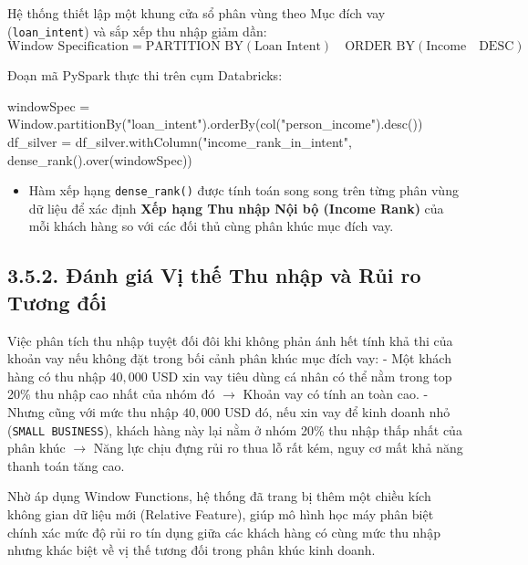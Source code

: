 \documentclass[
  13pt,
  a4paper,
]{report}
\newenvironment{Shaded}{\begin{snugshade}}{\end{snugshade}}
\newcommand{\NormalTok}[1]{\textcolor[rgb]{0.00,0.23,0.31}{#1}}
\newcommand{\OperatorTok}[1]{\textcolor[rgb]{0.37,0.37,0.37}{#1}}
\newcommand{\StringTok}[1]{\textcolor[rgb]{0.13,0.47,0.30}{#1}}
\providecommand{\tightlist}{%
  \setlength{\itemsep}{0pt}\setlength{\parskip}{0pt}}
\begin{document}
Hệ thống thiết lập một khung cửa sổ phân vùng theo Mục đích vay
(\texttt{loan\_intent}) và sắp xếp thu nhập giảm dần:
\[\text{Window Specification} = \text{PARTITION BY}(\text{Loan Intent}) \quad \text{ORDER BY}(\text{Income} \quad \text{DESC})\]

Đoạn mã PySpark thực thi trên cụm Databricks:

\begin{Shaded}
\begin{Highlighting}[]
\NormalTok{windowSpec }\OperatorTok{=}\NormalTok{ Window.partitionBy(}\StringTok{"loan\_intent"}\NormalTok{).orderBy(col(}\StringTok{"person\_income"}\NormalTok{).desc())}
\NormalTok{df\_silver }\OperatorTok{=}\NormalTok{ df\_silver.withColumn(}\StringTok{"income\_rank\_in\_intent"}\NormalTok{, dense\_rank().over(windowSpec))}
\end{Highlighting}
\end{Shaded}

\begin{itemize}
\tightlist
\item
  Hàm xếp hạng \texttt{dense\_rank()} được tính toán song song trên từng
  phân vùng dữ liệu để xác định \textbf{Xếp hạng Thu nhập Nội bộ (Income
  Rank)} của mỗi khách hàng so với các đối thủ cùng phân khúc mục đích
  vay.
\end{itemize}

\subsection{3.5.2. Đánh giá Vị thế Thu nhập và Rủi ro Tương
đối}\label{ux111uxe1nh-giuxe1-vux1ecb-thux1ebf-thu-nhux1eadp-vuxe0-rux1ee7i-ro-tux1b0ux1a1ng-ux111ux1ed1i}

Việc phân tích thu nhập tuyệt đối đôi khi không phản ánh hết tính khả
thi của khoản vay nếu không đặt trong bối cảnh phân khúc mục đích vay: -
Một khách hàng có thu nhập \(40,000\) USD xin vay tiêu dùng cá nhân có
thể nằm trong top 20\% thu nhập cao nhất của nhóm đó \(\rightarrow\)
Khoản vay có tính an toàn cao. - Nhưng cũng với mức thu nhập \(40,000\)
USD đó, nếu xin vay để kinh doanh nhỏ (\texttt{SMALL\ BUSINESS}), khách
hàng này lại nằm ở nhóm 20\% thu nhập thấp nhất của phân khúc
\(\rightarrow\) Năng lực chịu đựng rủi ro thua lỗ rất kém, nguy cơ mất
khả năng thanh toán tăng cao.

Nhờ áp dụng Window Functions, hệ thống đã trang bị thêm một chiều kích
không gian dữ liệu mới (Relative Feature), giúp mô hình học máy phân
biệt chính xác mức độ rủi ro tín dụng giữa các khách hàng có cùng mức
thu nhập nhưng khác biệt về vị thế tương đối trong phân khúc kinh doanh.
\end{document}
